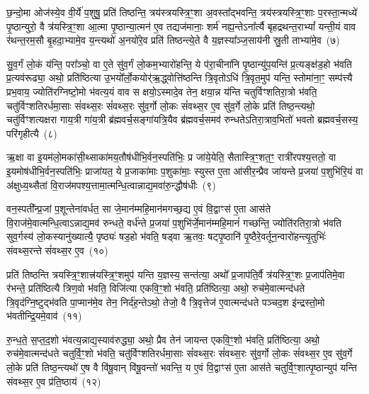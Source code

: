 छ॒न्दो॒मा ओज॑स्ये॒व वी॒र्ये॑ प॒शुषु॒ प्रति॑ तिष्ठन्ति॒ त्रय॑स्त्रयस्त्रि॒ꣳ॒शा अ॒वस्ता᳚द्भवन्ति॒ त्रय॑स्त्रयस्त्रि॒ꣳ॒शाः प॒रस्ता॒न्मध्ये॑ पृ॒ष्ठान्युरो॒ वै त्र॑यस्त्रि॒ꣳ॒शा आ॒त्मा पृ॒ष्ठान्या॒त्मन॑ ए॒व तद्यज॑मानाः॒ शर्म॑ नह्य॒न्ते\-ऽना᳚र्त्यै बृहद्रथन्त॒रा\-भ्यां᳚ यन्ती॒यं वाव र॑थन्त॒रम॒सौ बृ॒हदा॒भ्यामे॒व य॒न्त्यथो॑ अ॒नयो॑रे॒व प्रति॑ तिष्ठन्त्ये॒ते वै य॒ज्ञस्या᳚ञ्ज॒साय॑नी स्रु॒ती ताभ्या॑मे॒व~(७)

सु॒व॒र्गं लो॒कं य॑न्ति॒ परा᳚ञ्चो॒ वा ए॒ते सु॑व॒र्गं लो॒कम॒भ्यारो॑हन्ति॒ ये प॑रा॒चीना॑नि पृ॒ष्ठान्यु॑प॒यन्ति॑ प्र॒त्यङ्क्ष॑ड॒हो भ॑वति प्र॒त्यव॑रूढ्या॒ अथो॒ प्रति॑ष्ठित्या उ॒भयो᳚र्लो॒कयोर्\mbox{}॑ऋ॒द्ध्वोत्ति॑ष्ठन्ति त्रि॒वृतो\-ऽधि॑ त्रि॒वृत॒मुप॑ यन्ति॒ स्तोमा॑ना॒ꣳ॒ सम्प॑त्त्यै प्रभ॒वाय॒ ज्योति॑रग्निष्टो॒मो भ॑वत्य॒यं वाव स क्षयो॒\-ऽस्मादे॒व तेन॒ क्षया॒न्न य॑न्ति चतुर्विꣳशतिरा॒त्रो भ॑वति॒ चतु॑र्विꣳशतिरर्धमा॒साः सं॑वथ्स॒रः सं॑वथ्स॒रः सु॑व॒र्गो लो॒कः सं॑वथ्स॒र ए॒व सु॑व॒र्गे लो॒के प्रति॑ तिष्ठ॒न्त्यथो॒ चतु॑र्विꣳशत्यक्षरा गाय॒त्री गा॑य॒त्री ब्र॑ह्मवर्च॒सङ्गा॑यत्रि॒यैव ब्र॑ह्मवर्च॒समव॑ रुन्धते\-ऽतिरा॒त्राव॒भितो॑ भवतो ब्रह्मवर्च॒सस्य॒ परि॑गृहीत्यै~(८)

{\anuvakamend[{म॒नु॒ष्य॑स्य मध्य॒तः प॒शव॒स्ताभ्या॑मे॒व सं॑ वथ्स॒रश्चतु॑र्विꣳशतिश्च}]}%

ऋ॒क्षा वा इ॒यम॑लो॒मका॑सी॒थ्साका॑मय॒तौष॑धीभि॒र्वन॒स्पति॑भिः॒ प्र जा॑ये॒येति॒ सैतास्त्रि॒ꣳ॒शत॒ꣳ॒ रात्री॑रपश्य॒त्ततो॒ वा इ॒यमोष॑धीभि॒र्वन॒स्पति॑भिः॒ प्राजा॑यत॒ ये प्र॒जाका॑माः प॒शुका॑माः॒ स्युस्त ए॒ता आ॑सीर॒न्प्रैव जा॑यन्ते प्र॒जया॑ प॒शुभि॑रि॒यं वा अ॑क्षुध्य॒थ्सैतां वि॒राज॑मपश्य॒त्तामा॒त्मन्धि॒त्वान्नाद्य॒मवा॑रु॒न्द्धौष॑धीः~(९)

वन॒स्पती᳚न्प्र॒जां प॒शून्तेना॑वर्धत॒ सा जे॒मान॑म्महि॒मान॑मगच्छ॒द्य ए॒वं वि॒द्वाꣳस॑ ए॒ता आस॑ते वि॒राज॑मे॒वात्मन्धि॒त्वा\-ऽन्नाद्य॒मव॑ रुन्धते॒ वर्ध॑न्ते प्र॒जया॑ प॒शुभि॑र्जे॒मान॑म्महि॒मानं॑ गच्छन्ति॒ ज्योति॑रतिरा॒त्रो भ॑वति सुव॒र्गस्य॑ लो॒कस्यानु॑\-ख्यात्यै॒ पृष्ठ्यः॑ षड॒हो भ॑वति॒ षड्वा ऋ॒तवः॒ षट्पृ॒ष्ठानि॑ पृ॒ष्ठैरे॒वर्तून॒न्वारो॑हन्त्यृ॒तुभिः॑ संवथ्स॒रन्ते सं॑वथ्स॒र ए॒व~(१०)

प्रति॑ तिष्ठन्ति त्रयस्त्रि॒ꣳ॒शात्त्र॑यस्त्रि॒ꣳ॒शमुप॑ यन्ति य॒ज्ञस्य॒ सन्त॑त्या॒ अथो᳚ प्र॒जाप॑ति॒र्वै त्र॑यस्त्रि॒ꣳ॒शः प्र॒जाप॑तिमे॒वा र॑भन्ते॒ प्रति॑ष्ठित्यै त्रिण॒वो भ॑वति॒ विजि॑त्या एकवि॒ꣳ॒शो भ॑वति॒ प्रति॑ष्ठित्या॒ अथो॒ रुच॑मे॒वात्मन्द॑धते त्रि॒वृद॑ग्नि॒ष्टुद्भ॑वति पा॒प्मान॑मे॒व तेन॒ निर्द॑ह॒न्ते\-ऽथो॒ तेजो॒ वै त्रि॒वृत्तेज॑ ए॒वात्मन्द॑धते पञ्चद॒श इ॑न्द्रस्तो॒मो भ॑वतीन्द्रि॒यमे॒वाव॑~(११)

रु॒न्ध॒ते॒ स॒प्त॒द॒शो भ॑वत्य॒न्नाद्य॒स्याव॑रुद्ध्या॒ अथो॒ प्रैव तेन॑ जायन्त एकवि॒ꣳ॒शो भ॑वति॒ प्रति॑ष्ठित्या॒ अथो॒ रुच॑मे॒वात्मन्द॑धते चतुर्वि॒ꣳ॒शो भ॑वति॒ चतु॑र्विꣳशतिरर्धमा॒साः सं॑वथ्स॒रः सं॑वथ्स॒रः सु॑व॒र्गो लो॒कः सं॑वथ्स॒र ए॒व सु॑व॒र्गे लो॒के प्रति॑ तिष्ठ॒न्त्यथो॑ ए॒ष वै वि॑षू॒वान् वि॑षू॒वन्तो॑ भवन्ति॒ य ए॒वं वि॒द्वाꣳस॑ ए॒ता आस॑ते चतुर्वि॒ꣳ॒शात्पृ॒ष्ठान्युप॑ यन्ति संवथ्स॒र ए॒व प्र॑ति॒ष्ठाय॑~(१२)

